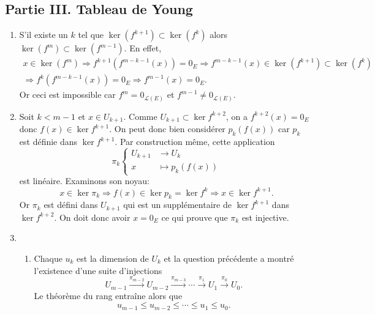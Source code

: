\subsection*{Partie III. Tableau de Young}
\begin{enumerate}
 \item S'il existe un $k$ tel que $\ker(f^{k+1})\subset \ker(f^{k})$ alors $\ker(f^{m})\subset \ker(f^{m-1})$.\newline
En effet, 
\begin{multline*}
 x\in \ker(f^{m}) \Rightarrow f^{k+1}(f^{m-k-1}(x))=0_E
\Rightarrow f^{m-k-1}(x) \in \ker(f^{k+1})\subset \ker(f^{k})\\
\Rightarrow f^{k}(f^{m-k-1}(x))=0_E \Rightarrow f^{m-1}(x)=0_E.
\end{multline*}
Or ceci est impossible car $f^{m}=0_{\mathcal{L}(E)}$ et $f^{m-1}\neq 0_{\mathcal{L}(E)}$. 
 \item Soit $k<m-1$ et $x\in U_{k+1}$. Comme $U_{k+1}\subset \ker f^{k+2}$, on a $f^{k+2}(x)=0_E$ donc $f(x)\in \ker f^{k+1}$. On peut donc bien considérer $p_k(f(x))$ car $p_k$ est définie dans $\ker f^{k+1}$. Par construction même, cette application
\begin{displaymath}
 \pi_k \left\lbrace 
\begin{aligned}
 U_{k+1} &\rightarrow U_{k} \\ x &\mapsto p_k(f(x))
\end{aligned}
\right. 
\end{displaymath}
 est linéaire. Examinons son noyau:
\begin{displaymath}
 x\in \ker \pi_k \Rightarrow f(x) \in \ker p_k = \ker f^k \Rightarrow x\in \ker f^{k+1}.
\end{displaymath}
Or $\pi_k$ est défini dans $U_{k+1}$ qui est un supplémentaire de $\ker f^{k+1}$ dans $\ker f^{k+2}$. On doit donc avoir $x=0_E$ ce qui prouve que $\pi_k$ est injective.
 \item
\begin{enumerate}
 \item Chaque $u_k$ est la dimension de $U_k$ et la question précédente a montré l'existence d'une suite d'injections
\begin{displaymath}
 U_{m-1}\xrightarrow{\pi_{m-2}}U_{m-2}\xrightarrow{\pi_{m-3}} \cdots \xrightarrow{\pi_{1}}U_1\xrightarrow{\pi_{0}}U_0.
\end{displaymath}
Le théorème du rang entraîne alors que
\begin{displaymath}
u_{m-1}\leq u_{m-2}\leq \cdots \leq u_1 \leq u_0.
\end{displaymath}


\end{enumerate}
\end{enumerate}
